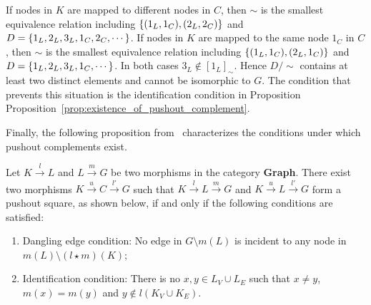 If nodes in $K$ are mapped to different nodes in $C$, then
        $\sim$ is the smallest equivalence relation including $\{(1_L,1_C),(2_L,2_C)\}$ and $D = \{1_L,2_L,3_L,1_C,2_C,\cdots\}$.
If nodes in $K$ are mapped to the same node $1_C$ in $C$, then
        $\sim$ is the smallest equivalence relation including $\{(1_L,1_C),(2_L,1_C)\}$ and $D = \{1_L,2_L,3_L,1_C,\cdots\}$.
In both cases \(3_L\notin[1_L]_\sim\). Hence \(D/\!\sim\) contains at least two distinct elements and cannot be isomorphic to \(G\). The condition that prevents this situation is the identification condition in Proposition Proposition~\ref{prop:existence_of_pushout_complement}.

Finally, the following proposition from~\cite{corradini1997algebraic} characterizes the conditions under which pushout complements exist.
\begin{proposition} 
    \label{prop:existence_of_pushout_complement}
    Let $K \overset{l}{\rightarrow} L$ and $L \overset{m}{\rightarrow} G$ be two morphisms in the category \textbf{Graph}. There exist two morphisms $K \overset{u}{\rightarrow} C \overset{l'}{\rightarrow} G$ such that $K \overset{l}{\rightarrow} L \overset{m}{\rightarrow} G$ and $K \overset{u}{\rightarrow} L \overset{l'}{\rightarrow} G$ form a pushout square, as shown 
    below, 
    if and only if the following conditions are satisfied:
    \begin{enumerate} 
        \item{Dangling edge condition:} 
        No edge in \(G\setminus m(L)\) is incident to any node in \(m(L) \setminus (l \star m)(K)\);
        \item{Identification condition: } There is no $x,y \in L_V \cup L_E$ such that $x \neq y$, $m(x) = m(y)$ and $y \notin l(K_V \cup K_E)$.
    \end{enumerate} 
    \begin{center}
        \end{center}
\end{proposition}
 
